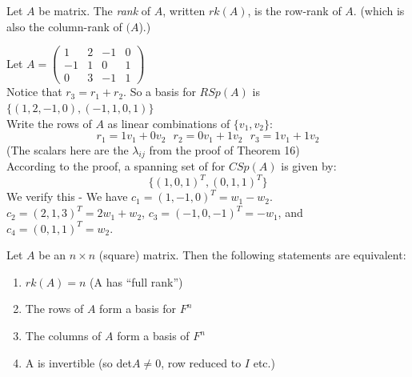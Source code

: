 \documentclass[twoside]{scrartcl}
\begin{document}
 
\begin{definition} Let $A$ be matrix. The \emph{rank} of $A$, written $rk(A)$, is the row-rank of $A$. (which is also the column-rank of $(A$).)	
\end{definition}\vspace*{10pt}


\begin{example}Let $A = \left(\begin{smallmatrix}
 1 & 2 & -1 & 0\\ -1 & 1 & 0 & 1\\ 0 & 3 & -1 & 1
 \end{smallmatrix}\right)$\\
 
 Notice that $r_3 = r_1 + r_2$. So a basis for $RSp(A)$ is $\{(1,2,-1,0),(-1,1,0,1)\}$\\
 
 Write the rows of $A$ as linear combinations of $\{v_1,v_2\}$:
 \[r_1 = 1v_1 + 0v_2~~~ r_2 = 0v_1 + 1v_2~~~ r_3 = 1v_1 + 1v_2\] (The scalars here are the $\lambda_{ij}$ from the proof of Theorem 16)\\
 
 According to the proof, a spanning set of for $CSp(A)$ is given by: \[\{(1,0,1)^T,(0,1,1)^T\}\] We verify this - 
 We have $c_1 = (1,-1,0)^T = w_1 - w_2$. $c_2 = (2,1,3)^T = 2w_1 + w_2$, $c_3 = (-1,0,-1)^T = -w_1$, and $c_4 = (0,1,1)^T = w_2$.
 \end{example}\vspace*{10pt}

\begin{proposition} 
 Let $A$ be an $n \times n$ (square) matrix. Then the following statements are equivalent:
\begin{enumerate}
\item $rk(A) = n$ (A has ``full rank'')
\item The rows of $A$ form a basis for $F^n$
\item The columns of $A$ form a basis of $F^n$
\item A is invertible (so det$A \neq 0$, row reduced to $I$ etc.)
\end{enumerate}
\end{proposition}
\end{document}
